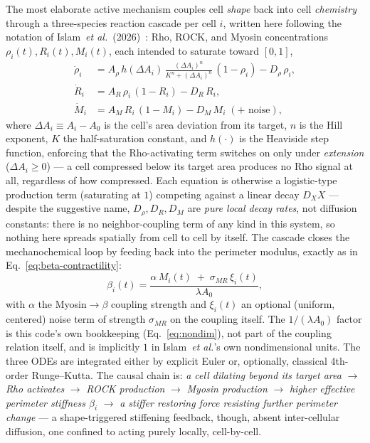 \documentclass[11pt]{article}
\begin{document}
The most elaborate active mechanism couples cell \emph{shape} back into cell
\emph{chemistry} through a three-species reaction cascade per cell $i$, written here
following the notation of Islam~\emph{et al.}~(2026)~\cite{islam2026}: Rho, ROCK, and
Myosin concentrations $\rho_i(t), R_i(t), M_i(t)$, each intended to saturate toward
$[0,1]$,
\begin{align}
  \dot\rho_i &= A_\rho\, h(\Delta A_i)\,\frac{(\Delta A_i)^n}{K^n + (\Delta A_i)^n}\,(1-\rho_i) - D_\rho\, \rho_i, \label{eq:rho}\\
  \dot R_i &= A_R\, \rho_i\,(1-R_i) - D_R\, R_i, \label{eq:rock}\\
  \dot M_i &= A_M\, R_i\,(1-M_i) - D_M\, M_i \;(+\text{ noise}), \label{eq:myosin}
\end{align}
where $\Delta A_i \equiv A_i - A_0$ is the cell's area deviation from its target, $n$ is
the Hill exponent, $K$ the half-saturation constant, and $h(\cdot)$ is the Heaviside
step function, enforcing that the Rho-activating term switches on only under
\emph{extension} ($\Delta A_i \geq 0$) --- a cell compressed below its target area
produces no Rho signal at all, regardless of how compressed. Each equation is
otherwise a logistic-type production term (saturating at $1$) competing against a
linear decay $D_X X$ --- despite the suggestive name, $D_\rho, D_R, D_M$ are \emph{pure
local decay rates}, not diffusion constants: there is no neighbor-coupling term of any
kind in this system, so nothing here spreads spatially from cell to cell by itself. The
cascade closes the mechanochemical loop by feeding back into the perimeter modulus,
exactly as in Eq.~\eqref{eq:beta-contractility}:
\begin{equation}
  \beta_i(t) = \frac{\alpha\, M_i(t) \;+\; \sigma_{MR}\,\xi_i(t)}{\lambda A_0},
  \label{eq:beta-rhorock}
\end{equation}
with $\alpha$ the Myosin$\to\beta$ coupling strength and $\xi_i(t)$ an optional
(uniform, centered) noise term of strength $\sigma_{MR}$ on the coupling itself. The
$1/(\lambda A_0)$ factor is this code's own bookkeeping (Eq.~\eqref{eq:nondim}), not
part of the coupling relation itself, and is implicitly $1$ in Islam~\emph{et al.}'s own
nondimensional units. The three ODEs are integrated either by explicit Euler or,
optionally, classical 4th-order Runge--Kutta. The causal chain is: \emph{a cell
dilating beyond its target area} $\to$ \emph{Rho activates} $\to$ \emph{ROCK
production} $\to$ \emph{Myosin production} $\to$ \emph{higher effective perimeter
stiffness $\beta_i$} $\to$ \emph{a stiffer restoring force resisting further perimeter
change} --- a shape-triggered stiffening feedback, though, absent inter-cellular
diffusion, one confined to acting purely locally, cell-by-cell.
\end{document}
